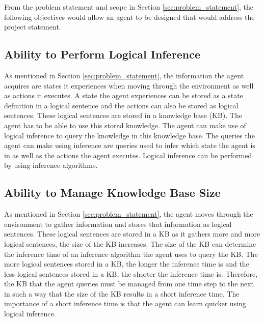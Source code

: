 From the problem statement and scope in Section \ref{sec:problem_statement}, the following objectives would allow an agent to be designed that would address the project statement.





\subsection{Ability to Perform Logical Inference}
\label{obj_1:log_inference}

As mentioned in Section \ref{sec:problem_statement}, the information the agent acquires are states it experiences when moving through the environment as well as actions it executes. A state the agent experiences can be stored as a state definition in a logical sentence and the actions can also be stored as logical sentences. These logical sentences are stored in a knowledge base (KB). The agent has to be able to use this stored knowledge. The agent can make use of logical inference to query the knowledge in this knowledge base. The queries the agent can make using inference are queries used to infer which state the agent is in as well as the actions the agent executes. Logical inference can be performed by using inference algorithms.


\subsection{Ability to Manage Knowledge Base Size}
\label{obj_2:knowledge_base_size}

As mentioned in Section \ref{sec:problem_statement}, the agent moves through the environment to gather information and stores that information as logical sentences. These logical sentences are stored in a KB as it gathers more and more logical sentences, the size of the KB increases. The size of the KB can determine the inference time of an inference algorithm the agent uses to query the KB. The more logical sentences stored in a KB, the longer the inference time is and the less logical sentences stored in a KB, the shorter the inference time is. Therefore, the KB that the agent queries must be managed from one time step to the next in such a way that the size of the KB results in a short inference time. The importance of a short inference time is that the agent can learn quicker using logical inference. 

